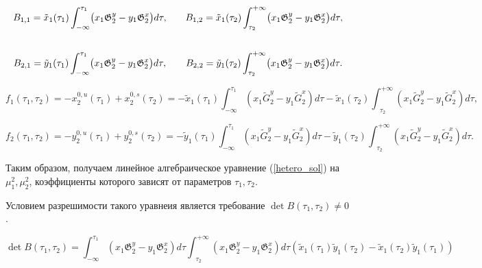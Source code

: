\[
\begin{array}{c@{\qquad}c}
B_{1,1} = \tilde x_1(\tau_1) \displaystyle\int_{-\infty}^{\tau_1} \bigl( x_1 \mathfrak{G}_2^y - y_1 \mathfrak{G}_2^x \bigr) d\tau,
&
B_{1,2} = \tilde x_1(\tau_2) \displaystyle\int_{\tau_2}^{+\infty} \bigl( x_1 \mathfrak{G}_2^y - y_1 \mathfrak{G}_2^x \bigr) d\tau, \\[10mm]
B_{2,1} = \tilde y_1(\tau_1) \displaystyle\int_{-\infty}^{\tau_1} \bigl( x_1 \mathfrak{G}_2^y - y_1 \mathfrak{G}_2^x \bigr) d\tau,
&
B_{2,2} = \tilde y_1(\tau_2) \displaystyle\int_{\tau_2}^{+\infty} \bigl( x_1 \mathfrak{G}_2^y - y_1 \mathfrak{G}_2^x \bigr) d\tau.
\end{array}
\]

\begin{equation*}
f_1(\tau_1, \tau_2) = - x_2^{0,u}(\tau_1) + x_2^{0,s}(\tau_2) = - \tilde x_1(\tau_1) \int_{-\infty}^{\tau_1} \left( x_1 \tilde{G}_2^y - y_1 \tilde{G}_2^x \right) d \tau - 
        \tilde x_1(\tau_2) \int_{\text{ } \tau_2}^{+\infty} \left( x_1 \tilde{G}_2^y - y_1 \tilde{G}_2^x \right) d \tau,
\end{equation*}     

\begin{equation*}
f_2(\tau_1, \tau_2) = - y_2^{0,u}(\tau_1) + y_2^{0,s}(\tau_2) = - \tilde y_1(\tau_1) \int_{-\infty}^{\tau_1} \left( x_1 \tilde{G}_2^y - y_1 \tilde{G}_2^x \right) d \tau - \tilde y_1(\tau_2) \int_{\text{ } \tau_2}^{+\infty} \left( x_1 \tilde{G}_2^y - y_1 \tilde{G}_2^x \right) d \tau.
\end{equation*}     

Таким образом, получаем линейное алгебраическое уравнение (\ref{hetero_sol}) на $\mu_1^2, \mu_2^2$, коэффициенты которого зависят от параметров $\tau_1, \tau_2$.
 
Условием разрешимости такого уравнеия является требование $\det B(\tau_1,\tau_2) \neq 0$.

\begin{equation*}
\det B(\tau_1,\tau_2) = 
\int_{-\infty}^{\tau_1} \left( x_1 \mathfrak{G}_2^y - y_1 \mathfrak{G}_2^x \right) d \tau 
\int_{\text{ } \tau_2}^{+\infty} \left( x_1 \mathfrak{G}_2^y - y_1 \mathfrak{G}_2^x \right) d \tau
\left( \tilde x_1(\tau_1) \tilde y_1(\tau_2) - \tilde x_1(\tau_2) \tilde y_1(\tau_1) \right) 
\end{equation*}

